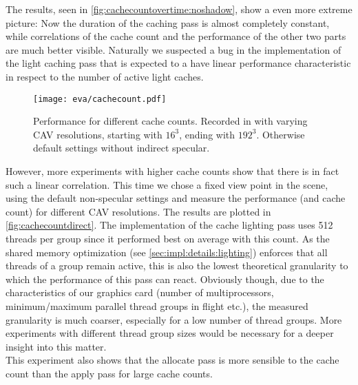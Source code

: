 \documentclass[thesis.tex]{subfiles}
\begin{document}
The results, seen in \autoref{fig:cachecountovertime:noshadow}, show a even more extreme picture:
Now the duration of the caching pass is almost completely constant, while correlations of the cache count and the performance of the other two parts are much better visible.
Naturally we suspected a bug in the implementation of the light caching pass that is expected to a have linear performance characteristic in respect to the number of active light caches.
\begin{figure}
\centering
\texttt{[image: eva/cachecount.pdf]}
\caption{Performance for different cache counts. Recorded in  with varying CAV resolutions, starting with $16^3$, ending with $192^3$. Otherwise default settings without indirect specular. }
\label{fig:cachecountdirect}
\end{figure}
However, more experiments with higher cache counts show that there is in fact such a linear correlation.
This time we chose a fixed view point in the  scene, using the default non-specular settings and measure the performance (and cache count) for different CAV resolutions.
The results are plotted in \autoref{fig:cachecountdirect}.
The implementation of the cache lighting pass uses 512 threads per group since it performed best on average with this count.
As the shared memory optimization (see \autoref{sec:impl:details:lighting}) enforces that all threads of a group remain active, this is also the lowest theoretical granularity to which the performance of this pass can react.
Obviously though, due to the characteristics of our graphics card (number of multiprocessors, minimum/maximum parallel thread groups in flight etc.), the measured granularity is much coarser, especially for a low number of thread groups.
More experiments with different thread group sizes would be necessary for a deeper insight into this matter.
\\
This experiment also shows that the allocate pass is more sensible to the cache count than the apply pass for large cache counts.
\end{document}
